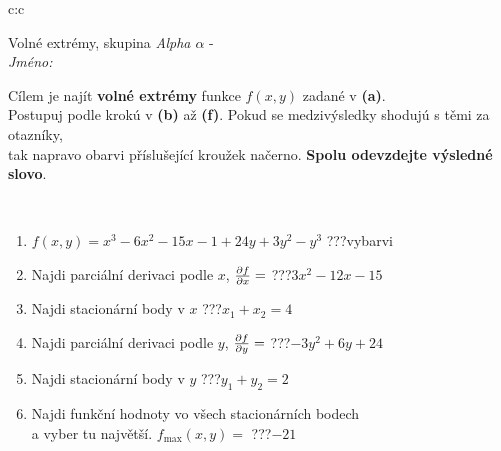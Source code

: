 \documentclass[10pt]{report}
\begin{document}
\thispagestyle{empty}
\begin{tabular}{c:c}
\begin{minipage}[c][104.5mm][t]{0.5\linewidth}
\begin{center}
\vspace{7mm}
{\huge Volné extrémy, skupina \textit{Alpha $\alpha$} -}\\[5mm]
\textit{Jméno:}\phantom{xxxxxxxxxxxxxxxxxxxxxxxxxxxxxxxxxxxxxxxxxxxxxxxxxxxxxxxxxxxxxxxxx}\\[5mm]
\begin{minipage}{0.95\linewidth}
\begin{center}
Cílem je najít \textbf{volné extrémy} funkce $f(x,y)$ zadané v \textbf{(a)}.\\Postupuj podle krokú v \textbf{(b)} až \textbf{(f)}. Pokud se medzivýsledky shodujú s těmi za otazníky,\\tak napravo obarvi příslušející kroužek načerno. \textbf{Spolu odevzdejte výsledné slovo}.
\end{center}
\end{minipage}
\\[1mm]
\begin{minipage}{0.79\linewidth}
\begin{center}
\begin{varwidth}{\linewidth}
\begin{enumerate}
\normalsize
\item $f(x,y)=x^3-6x^2-15x-1+24y+3y^2-y^3$\quad \dotfill\; ???\;\dotfill \quad vybarvi
\item Najdi parciální derivaci podle $x$, $\pdv{f}{x}=$\quad \dotfill\; ???\;\dotfill \quad $3x^2-12x-15$
\item Najdi stacionární body v $x$\quad \dotfill\; ???\;\dotfill \quad $x_1+x_2=4$
\item Najdi parciální derivaci podle $y$, $\pdv{f}{y}=$\quad \dotfill\; ???\;\dotfill \quad $-3y^2+6y+24$
\item Najdi stacionární body v $y$\quad \dotfill\; ???\;\dotfill \quad $y_1+y_2=2$
\item Najdi funkční hodnoty vo všech stacionárních bodech \\ \phantom{xxxxxx} a vyber tu najvětší. $f_{\text{max}}(x,y)=$\quad \dotfill\; ???\;\dotfill \quad $-21$
\end{enumerate}
\end{varwidth}
\end{center}
\end{minipage}
\begin{minipage}{0.20\linewidth}

\end{minipage}
\end{center}
\end{minipage}
\end{tabular}
\end{document}
